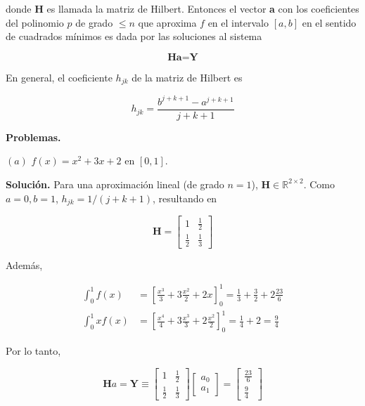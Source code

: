 \documentclass[12pt]{article}
\begin{document}
donde \textbf{H} es llamada la matriz de Hilbert. Entonces el vector \textbf{a}
con los coeficientes del polinomio $p$ de grado $\leq n$ que aproxima $f$ en el
intervalo $[a, b]$ en el sentido de cuadrados mínimos es dada por las soluciones
al sistema 

\begin{equation*}
    \textbf{H} \textbf{a} = \textbf{Y}
\end{equation*}

En general, el coeficiente $h_{jk}$ de la matriz de Hilbert es


\begin{equation*}
    h_{jk} = \frac{b^{j+k+1} - a^{j+k+1}}{j+k+1} 
\end{equation*}

\textbf{Problemas.}

$(a)$ $f(x) = x^2 + 3x + 2$ en $[0, 1]$.

\textbf{Solución.} Para una aproximación lineal (de grado $n = 1$), $\textbf{H}
\in \mathbb{R}^{2\times 2}$. Como $a = 0, b = 1$, $h_{jk} = 1 / (j+k+1)$,
resultando en 

\begin{equation*}
    \textbf{H} = \begin{bmatrix} 
        1 & \frac{1}{2}  \\
        \frac{1}{2} & \frac{1}{3}
    \end{bmatrix} 
\end{equation*}

Además,

\begin{align*}
    \int_0^1 f(x) &= \left[ \frac{x^3}{3} + 3 \frac{x^2}{2} + 2x \right]_0^1 =
    \frac{1}{3} + \frac{3}{2} + 2 \frac{23}{6} \\ 
    \int_0^1  x f(x) &= \left[ \frac{x^4}{4} + 3 \frac{x^3}{3} + 2 \frac{x^2}{2}
    \right]_0^1 = \frac{1}{4} + 2 = \frac{9}{4}
\end{align*}

Por lo tanto, 

\begin{equation*}
    \textbf{H} a = \textbf{Y} \equiv \begin{bmatrix} 
        1 & \frac{1}{2}  \\ 
        \frac{1}{2} & \frac{1}{3}
    \end{bmatrix} \begin{bmatrix} 
            a_0 \\ a_1 
    \end{bmatrix} = \begin{bmatrix} 
             \frac{23}{6} \\ \frac{9}{4}
    \end{bmatrix} 
\end{equation*}
\end{document}
